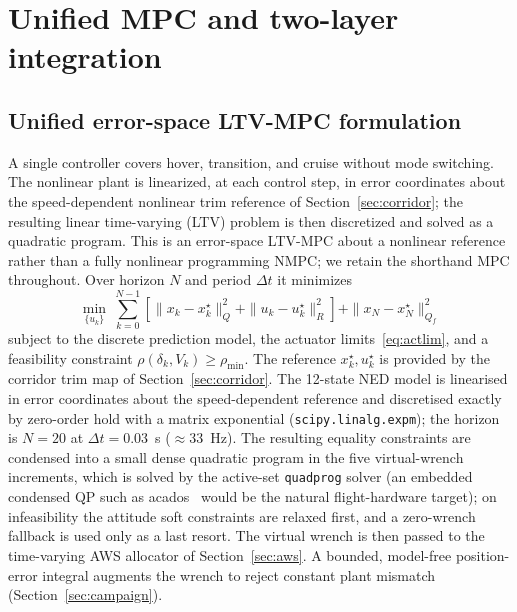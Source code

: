 \documentclass[preprint,3p,11pt]{elsarticle}
\begin{document}
\section{Unified MPC and two-layer integration}\label{sec:nmpc}

\subsection{Unified error-space LTV-MPC formulation}\label{sec:nmpcform}
A single controller covers hover, transition, and cruise without mode
switching. The nonlinear plant is linearized, at each control step, in error
coordinates about the speed-dependent nonlinear trim reference of
Section~\ref{sec:corridor}; the resulting linear time-varying (LTV) problem is
then discretized and solved as a quadratic program. This is an error-space
LTV-MPC about a nonlinear reference rather than a fully nonlinear programming
NMPC; we retain the shorthand MPC throughout. Over horizon $N$ and period
$\Delta t$ it minimizes
\begin{equation}
\min_{\{u_k\}}\ \sum_{k=0}^{N-1}
\!\left[\|x_k-x_k^\star\|_{Q}^{2}+\|u_k-u_k^\star\|_{R}^{2}\right]
+\|x_N-x_N^\star\|_{Q_f}^{2}
\label{eq:nmpc}
\end{equation}
subject to the discrete prediction model, the actuator
limits~\eqref{eq:actlim}, and a feasibility constraint
$\rho(\delta_k,V_k)\ge\rho_{\min}$. The reference $x_k^\star,u_k^\star$ is
provided by the corridor trim map of Section~\ref{sec:corridor}. The
12-state NED model is linearised in error coordinates about the
speed-dependent reference and discretised exactly by zero-order hold with a
matrix exponential (\texttt{scipy.linalg.expm}); the horizon is
$N=20$ at $\Delta t=0.03$~s ($\approx 33$~Hz). The resulting equality
constraints are condensed into a small dense quadratic program in the
five virtual-wrench increments, which is solved by the active-set
\texttt{quadprog} solver (an embedded condensed QP such as
acados~\cite{verschueren2022acados} would be the natural flight-hardware
target); on infeasibility the attitude soft constraints are
relaxed first, and a zero-wrench fallback is used only as a last resort.
The virtual wrench is then passed to the time-varying AWS allocator of
Section~\ref{sec:aws}. A bounded, model-free position-error integral
augments the wrench to reject constant plant mismatch (Section~\ref{sec:campaign}).
\end{document}
